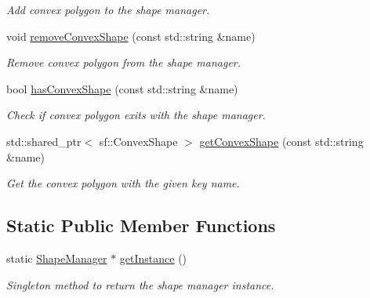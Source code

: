 \begin{DoxyCompactItemize}
\begin{DoxyCompactList}\small\item\em Add convex polygon to the shape manager. \end{DoxyCompactList}\item 
\hypertarget{class_shape_manager_a9643dc2f7ebd1e0aeb616a33b86cb97c}{void \hyperlink{class_shape_manager_a9643dc2f7ebd1e0aeb616a33b86cb97c}{remove\-Convex\-Shape} (const std\-::string \&name)}\label{d0/d65/class_shape_manager_a9643dc2f7ebd1e0aeb616a33b86cb97c}

\begin{DoxyCompactList}\small\item\em Remove convex polygon from the shape manager. \end{DoxyCompactList}\item 
\hypertarget{class_shape_manager_adc610abaed1e6dcab935117f91418470}{bool \hyperlink{class_shape_manager_adc610abaed1e6dcab935117f91418470}{has\-Convex\-Shape} (const std\-::string \&name)}\label{d0/d65/class_shape_manager_adc610abaed1e6dcab935117f91418470}

\begin{DoxyCompactList}\small\item\em Check if convex polygon exits with the shape manager. \end{DoxyCompactList}\item 
\hypertarget{class_shape_manager_a0a07b7e7690736e972a17c31cf6ea7af}{std\-::shared\-\_\-ptr$<$ sf\-::\-Convex\-Shape $>$ \hyperlink{class_shape_manager_a0a07b7e7690736e972a17c31cf6ea7af}{get\-Convex\-Shape} (const std\-::string \&name)}\label{d0/d65/class_shape_manager_a0a07b7e7690736e972a17c31cf6ea7af}

\begin{DoxyCompactList}\small\item\em Get the convex polygon with the given key name. \end{DoxyCompactList}\end{DoxyCompactItemize}
\subsection*{Static Public Member Functions}
\begin{DoxyCompactItemize}
\item 
static \hyperlink{class_shape_manager}{Shape\-Manager} $\ast$ \hyperlink{class_shape_manager_a94d827d6ef5cd970b05886b95fd32ece}{get\-Instance} ()
\begin{DoxyCompactList}\small\item\em Singleton method to return the shape manager instance. \end{DoxyCompactList}\end{DoxyCompactItemize}



